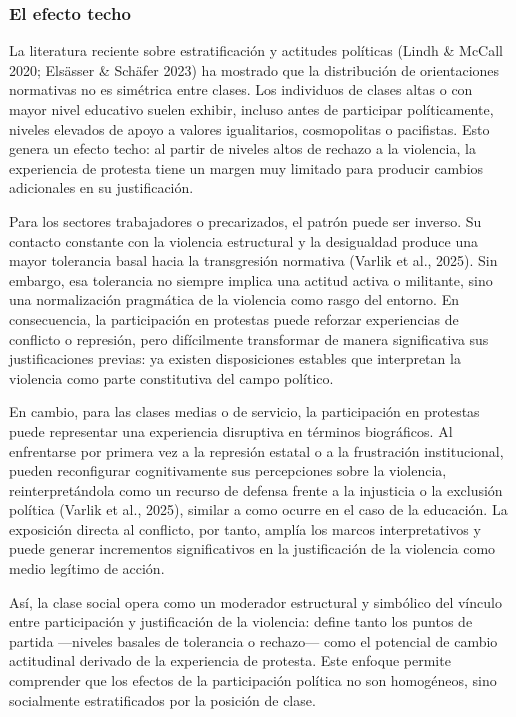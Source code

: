 \documentclass[
  13pt,
]{article}
\begin{document}
\subsubsection{El efecto techo}\label{el-efecto-techo}

La literatura reciente sobre estratificación y actitudes políticas
(Lindh \& McCall 2020; Elsässer \& Schäfer 2023) ha mostrado que la
distribución de orientaciones normativas no es simétrica entre clases.
Los individuos de clases altas o con mayor nivel educativo suelen
exhibir, incluso antes de participar políticamente, niveles elevados de
apoyo a valores igualitarios, cosmopolitas o pacifistas. Esto genera un
efecto techo: al partir de niveles altos de rechazo a la violencia, la
experiencia de protesta tiene un margen muy limitado para producir
cambios adicionales en su justificación.

Para los sectores trabajadores o precarizados, el patrón puede ser
inverso. Su contacto constante con la violencia estructural y la
desigualdad produce una mayor tolerancia basal hacia la transgresión
normativa (Varlik et al., 2025). Sin embargo, esa tolerancia no siempre
implica una actitud activa o militante, sino una normalización
pragmática de la violencia como rasgo del entorno. En consecuencia, la
participación en protestas puede reforzar experiencias de conflicto o
represión, pero difícilmente transformar de manera significativa sus
justificaciones previas: ya existen disposiciones estables que
interpretan la violencia como parte constitutiva del campo político.

En cambio, para las clases medias o de servicio, la participación en
protestas puede representar una experiencia disruptiva en términos
biográficos. Al enfrentarse por primera vez a la represión estatal o a
la frustración institucional, pueden reconfigurar cognitivamente sus
percepciones sobre la violencia, reinterpretándola como un recurso de
defensa frente a la injusticia o la exclusión política (Varlik et al.,
2025), similar a como ocurre en el caso de la educación. La exposición
directa al conflicto, por tanto, amplía los marcos interpretativos y
puede generar incrementos significativos en la justificación de la
violencia como medio legítimo de acción.

Así, la clase social opera como un moderador estructural y simbólico del
vínculo entre participación y justificación de la violencia: define
tanto los puntos de partida ---niveles basales de tolerancia o
rechazo--- como el potencial de cambio actitudinal derivado de la
experiencia de protesta. Este enfoque permite comprender que los efectos
de la participación política no son homogéneos, sino socialmente
estratificados por la posición de clase.
\end{document}
